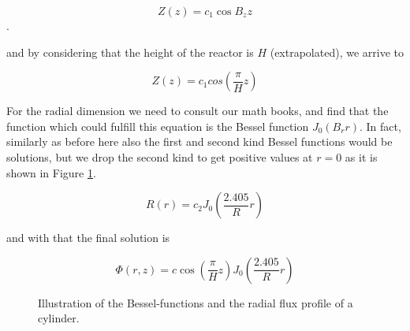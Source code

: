 \[
Z(z)=c_1\cos B_zz
\].  

\noindent and by considering that the height of the reactor is $H$ (extrapolated), we arrive to

\[
Z(z)=c_1cos(\frac{\pi}{H}z)
\]

For the radial dimension we need to consult our math books, and find that the function which could fulfill this equation is the Bessel function $J_0(B_rr)$. In fact, similarly as before here also the first and second kind Bessel functions would be solutions, but we drop the second kind to get positive values at $r=0$ as it is shown in Figure \ref{fig:cylinder}.

\[
R(r)=c_2J_0(\frac{2.405}{R}r)
\]

\noindent and with that the final solution is

\[
\Phi(r,z)=c\cos(\frac{\pi}{H}z)J_0(\frac{2.405}{R}r)
\]

\begin{figure}[ht!]
\protect {}\protect
\caption{\label{fig:cylinder} \footnotesize{Illustration of the Bessel-functions and the radial flux profile of a cylinder.}}
\end{figure} 

